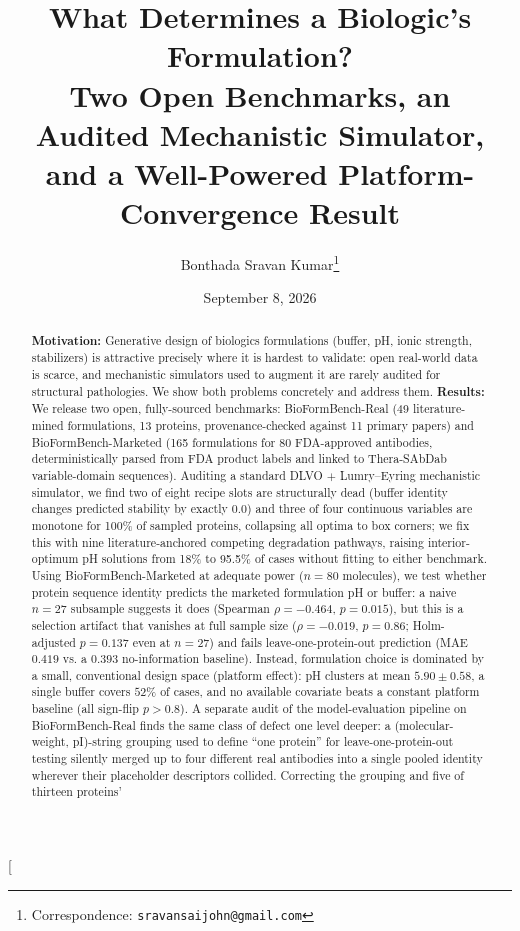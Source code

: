 \documentclass[twocolumn,10pt]{article}
\title{\vspace{-1.2em}\bfseries\Large What Determines a Biologic's Formulation?\\
Two Open Benchmarks, an Audited Mechanistic Simulator,\\
and a Well-Powered Platform-Convergence Result\vspace{-0.4em}}
\author[ ]{Bonthada Sravan Kumar\thanks{Correspondence: \texttt{sravansaijohn@gmail.com}}}
\affil[ ]{\small Independent Researcher}
\date{\small September 8, 2026}
\begin{document}
\twocolumn[
\begin{@twocolumnfalse}
\maketitle
\begin{abstract}
\noindent
\textbf{Motivation:} Generative design of biologics formulations (buffer, pH,
ionic strength, stabilizers) is attractive precisely where it is hardest to
validate: open real-world data is scarce, and mechanistic simulators used to
augment it are rarely audited for structural pathologies. We show both problems
concretely and address them.
\textbf{Results:} We release two open, fully-sourced benchmarks: BioFormBench-Real
(49 literature-mined formulations, 13 proteins, provenance-checked against 11
primary papers) and BioFormBench-Marketed (165 formulations for 80 FDA-approved
antibodies, deterministically parsed from FDA product labels and linked to
Thera-SAbDab variable-domain sequences). Auditing a standard DLVO $+$
Lumry--Eyring mechanistic simulator, we find two of eight recipe slots are
structurally dead (buffer identity changes predicted stability by exactly $0.0$)
and three of four continuous variables are monotone for 100\% of sampled proteins,
collapsing all optima to box corners; we fix this with nine literature-anchored
competing degradation pathways, raising interior-optimum pH solutions from 18\% to
95.5\% of cases without fitting to either benchmark. Using BioFormBench-Marketed at
adequate power ($n=80$ molecules), we test whether protein sequence identity
predicts the marketed formulation pH or buffer: a naive $n=27$ subsample suggests
it does (Spearman $\rho = -0.464$, $p = 0.015$), but this is a selection artifact
that vanishes at full sample size ($\rho = -0.019$, $p = 0.86$; Holm-adjusted
$p = 0.137$ even at $n=27$) and fails leave-one-protein-out prediction (MAE $0.419$
vs. a $0.393$ no-information baseline). Instead, formulation choice is dominated by
a small, conventional design space (platform effect): pH clusters at
mean $5.90 \pm 0.58$, a single buffer covers $52\%$ of cases, and no available
covariate beats a constant platform baseline (all sign-flip $p > 0.8$). A separate
audit of the model-evaluation pipeline on BioFormBench-Real finds the same class of
defect one level deeper: a (molecular-weight, pI)-string grouping used to define
``one protein'' for leave-one-protein-out testing silently merged up to four
different real antibodies into a single pooled identity wherever their placeholder
descriptors collided. Correcting the grouping and five of thirteen proteins'

\end{abstract}
\end{@twocolumnfalse}
\end{document}
